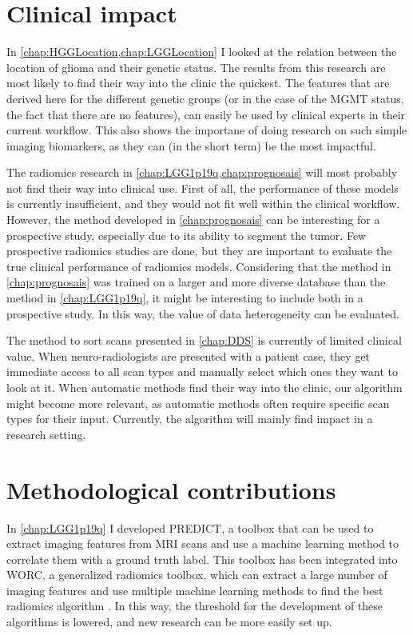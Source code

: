 \section{Clinical impact}

In \cref{chap:HGGLocation,chap:LGGLocation} I looked at the relation between the location of \gls{glioma} and their genetic status.
The results from this research are most likely to find their way into the clinic the quickest.
The features that are derived here for the different genetic groups (or in the case of the \gls{MGMT} status, the fact that there are no features), can easily be used by clinical experts in their current workflow.
This also shows the importane of doing research on such simple imaging biomarkers, as they can (in the short term) be the most impactful.

The radiomics research in \cref{chap:LGG1p19q,chap:prognosais} will most probably not find their way into clinical use.
First of all, the performance of these models is currently insufficient, and they would not fit well within the clinical workflow.
However, the method developed in \cref{chap:prognosais} can be interesting for a prospective study, especially due to its ability to segment the \gls{tumor}.
Few prospective radiomics studies are done, but they are important to evaluate the true clinical performance of radiomics models.
Considering that the method in \cref{chap:prognosais} was trained on a larger and more diverse database than the method in \cref{chap:LGG1p19q}, it might be interesting to include both in a prospective study.
In this way, the value of data heterogeneity can be evaluated.

The method to sort scans presented in \cref{chap:DDS} is currently of limited clinical value.
When neuro-radiologists are presented with a patient case, they get immediate access to all scan types and manually select which ones they want to look at it.
When automatic methods find their way into the clinic, our algorithm might become more relevant, as automatic methods often require specific scan types for their input.
Currently, the algorithm will mainly find impact in a research setting.

\section{Methodological contributions}
In \cref{chap:LGG1p19q} I developed PREDICT, a toolbox that can be used to extract imaging features from \gls{MRI} scans and use a machine learning method to correlate them with a ground truth label.
This toolbox has been integrated into WORC, a generalized radiomics toolbox, which can extract a large number of imaging features and use multiple machine learning methods to find the best radiomics algorithm \autocite{mstarmans2020worc}.
In this way, the threshold for the development of these algorithms is lowered, and new research can be more easily set up.

